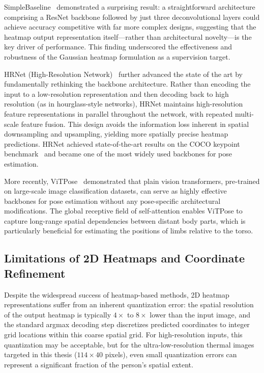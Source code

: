SimpleBaseline~\cite{xiao2018simple} demonstrated a surprising result: a straightforward architecture comprising a ResNet backbone followed by just three deconvolutional layers could achieve accuracy competitive with far more complex designs, suggesting that the heatmap output representation itself---rather than architectural novelty---is the key driver of performance. This finding underscored the effectiveness and robustness of the Gaussian heatmap formulation as a supervision target.

HRNet (High-Resolution Network)~\cite{sun2019hrnet} further advanced the state of the art by fundamentally rethinking the backbone architecture. Rather than encoding the input to a low-resolution representation and then decoding back to high resolution (as in hourglass-style networks), HRNet maintains high-resolution feature representations in parallel throughout the network, with repeated multi-scale feature fusion. This design avoids the information loss inherent in spatial downsampling and upsampling, yielding more spatially precise heatmap predictions. HRNet achieved state-of-the-art results on the COCO keypoint benchmark~\cite{lin2014microsoft} and became one of the most widely used backbones for pose estimation.

More recently, ViTPose~\cite{xu2022vitpose} demonstrated that plain vision transformers, pre-trained on large-scale image classification datasets, can serve as highly effective backbones for pose estimation without any pose-specific architectural modifications. The global receptive field of self-attention enables ViTPose to capture long-range spatial dependencies between distant body parts, which is particularly beneficial for estimating the positions of limbs relative to the torso.

\subsection*{Limitations of 2D Heatmaps and Coordinate Refinement}

Despite the widespread success of heatmap-based methods, 2D heatmap representations suffer from an inherent quantization error: the spatial resolution of the output heatmap is typically $4\times$ to $8\times$ lower than the input image, and the standard argmax decoding step discretizes predicted coordinates to integer grid locations within this coarse spatial grid. For high-resolution inputs, this quantization may be acceptable, but for the ultra-low-resolution thermal images targeted in this thesis ($114 \times 40$ pixels), even small quantization errors can represent a significant fraction of the person's spatial extent.

